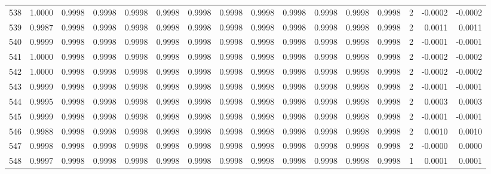 \begin{tabular}{lrrrrrrrrrrrrrrr}
538 &      1.0000 &  0.9998 &  0.9998 &  0.9998 &  0.9998 &  0.9998 &  0.9998 &  0.9998 &  0.9998 &  0.9998 &   0.9998 &     0.9998 &      2 &                   -0.0002 &                    -0.0002 \\
539 &      0.9987 &  0.9998 &  0.9998 &  0.9998 &  0.9998 &  0.9998 &  0.9998 &  0.9998 &  0.9998 &  0.9998 &   0.9998 &     0.9998 &      2 &                    0.0011 &                     0.0011 \\
540 &      0.9999 &  0.9998 &  0.9998 &  0.9998 &  0.9998 &  0.9998 &  0.9998 &  0.9998 &  0.9998 &  0.9998 &   0.9998 &     0.9998 &      2 &                   -0.0001 &                    -0.0001 \\
541 &      1.0000 &  0.9998 &  0.9998 &  0.9998 &  0.9998 &  0.9998 &  0.9998 &  0.9998 &  0.9998 &  0.9998 &   0.9998 &     0.9998 &      2 &                   -0.0002 &                    -0.0002 \\
542 &      1.0000 &  0.9998 &  0.9998 &  0.9998 &  0.9998 &  0.9998 &  0.9998 &  0.9998 &  0.9998 &  0.9998 &   0.9998 &     0.9998 &      2 &                   -0.0002 &                    -0.0002 \\
543 &      0.9999 &  0.9998 &  0.9998 &  0.9998 &  0.9998 &  0.9998 &  0.9998 &  0.9998 &  0.9998 &  0.9998 &   0.9998 &     0.9998 &      2 &                   -0.0001 &                    -0.0001 \\
544 &      0.9995 &  0.9998 &  0.9998 &  0.9998 &  0.9998 &  0.9998 &  0.9998 &  0.9998 &  0.9998 &  0.9998 &   0.9998 &     0.9998 &      2 &                    0.0003 &                     0.0003 \\
545 &      0.9999 &  0.9998 &  0.9998 &  0.9998 &  0.9998 &  0.9998 &  0.9998 &  0.9998 &  0.9998 &  0.9998 &   0.9998 &     0.9998 &      2 &                   -0.0001 &                    -0.0001 \\
546 &      0.9988 &  0.9998 &  0.9998 &  0.9998 &  0.9998 &  0.9998 &  0.9998 &  0.9998 &  0.9998 &  0.9998 &   0.9998 &     0.9998 &      2 &                    0.0010 &                     0.0010 \\
547 &      0.9998 &  0.9998 &  0.9998 &  0.9998 &  0.9998 &  0.9998 &  0.9998 &  0.9998 &  0.9998 &  0.9998 &   0.9998 &     0.9998 &      2 &                   -0.0000 &                     0.0000 \\
548 &      0.9997 &  0.9998 &  0.9998 &  0.9998 &  0.9998 &  0.9998 &  0.9998 &  0.9998 &  0.9998 &  0.9998 &   0.9998 &     0.9998 &      1 &                    0.0001 &                     0.0001 \\

\end{tabular}
